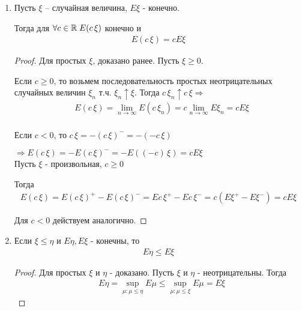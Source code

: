 \begin{enumerate}[label=\protect\circled{\arabic*},series=mean_properties]

  \item
    Пусть $\xi$ -- случайная величина, $E \xi$ - конечно.

    Тогда для $\forall c \in \mathbb{R} \; E(c\,\xi)$ конечно и
    \begin{align*}
      E(c\,\xi) = c E \xi
    \end{align*}

    \begin{proof}
      Для простых $\xi$, доказано ранее. Пусть $\xi \geq 0$. 

      Если $c \geq 0$, то возьмем последовательность простых неотрицательных 
      случайных величин $\xi_n$ т.ч. $\xi_n \uparrow \xi$.
      Тогда $c\, \xi_n \uparrow c\, \xi \Rightarrow$
      \begin{align*}
        &E (c\,\xi) = \lim_{n \to \infty} E(c\,\xi_n) = 
        c \lim_{n \to \infty} E \xi_n = c E \xi\\
      \end{align*}

      Если $c < 0$, то $c\,\xi = - (c\,\xi)^- = -(-c\,\xi)$

      $\Rightarrow E(c\,\xi) = - E(c\,\xi)^- = - E((-c)\,\xi) = c E \xi$\\

      Пусть $\xi$ - произвольная, $c \geq 0$

      Тогда 
      \begin{align*}
        E(c\,\xi) = E(c\,\xi)^+ - E(c\,\xi)^- = 
        E c\,\xi^+ - E c\,\xi^- = c (E \xi^+ - E \xi^-) = c E \xi
      \end{align*}


      Для $c < 0$ действуем аналогично.
    \end{proof}

  \item
    Если $\xi \leq \eta$ и $E \eta, E\xi$ - конечны, то 
    \begin{align*}
      E \eta \leq E \xi
    \end{align*}

    \begin{proof}
      Для простых $\xi$ и $\eta$ - доказано. Пусть $\xi$ и $\eta$ - неотрицательны. 
      Тогда
      \begin{align*}
        &E \eta = \sup_{\mu : \mu \leq \eta} E \mu
        \leq \sup_{\mu : \mu \leq \xi} E \mu = E \xi
      \end{align*}


\end{proof}
\end{enumerate}
